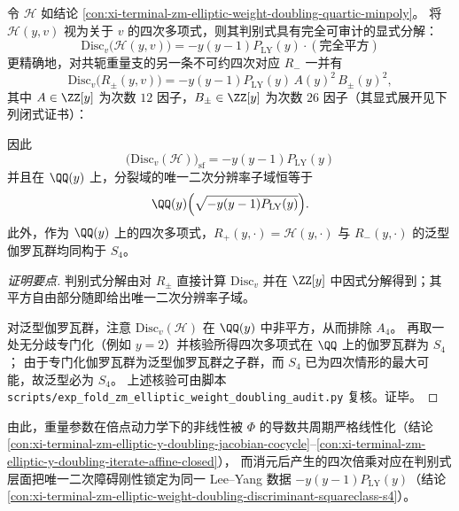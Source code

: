 \begin{conclusion}\label{con:xi-terminal-zm-elliptic-weight-doubling-discriminant-squareclass-s4}\label{con:xi-terminal-zm-elliptic-weight-doubling-quartic-elimination-disc}
令 \(\mathcal H\) 如结论 \ref{con:xi-terminal-zm-elliptic-weight-doubling-quartic-minpoly}。
将 \(\mathcal H(y,v)\) 视为关于 \(v\) 的四次多项式，则其判别式具有完全可审计的显式分解：
\[
\boxed{\;
\mathrm{Disc}_{v}\bigl(\mathcal H(y,v)\bigr)=-y(y-1)P_{\mathrm{LY}}(y)\cdot(\text{完全平方})\;}
\]
更精确地，对共轭重量支的另一条不可约四次对应 \(R_{-}\) 一并有
\[
\mathrm{Disc}_{v}\bigl(R_{\pm}(y,v)\bigr)=-y(y-1)P_{\mathrm{LY}}(y)\,A(y)^{2}\,B_{\pm}(y)^{2},
\]
其中 \(A\in\ZZ[y]\) 为次数 \(12\) 因子，\(B_{\pm}\in\ZZ[y]\) 为次数 \(26\) 因子（其显式展开见下列闭式证书）：

因此
\[
\boxed{\;
\bigl(\mathrm{Disc}_{v}(\mathcal H)\bigr)_{\mathrm{sf}}=-y(y-1)P_{\mathrm{LY}}(y)\;}
\]
并且在 \(\QQ(y)\) 上，分裂域的唯一二次分辨率子域恒等于
\[
\QQ(y)\Bigl(\sqrt{-y(y-1)P_{\mathrm{LY}}(y)}\Bigr).
\]
此外，作为 \(\QQ(y)\) 上的四次多项式，\(R_{+}(y,\cdot)=\mathcal H(y,\cdot)\) 与 \(R_{-}(y,\cdot)\) 的泛型伽罗瓦群均同构于 \(S_{4}\)。
\end{conclusion}
\begin{proof}[证明要点]
判别式分解由对 \(R_{\pm}\) 直接计算 \(\mathrm{Disc}_{v}\) 并在 \(\ZZ[y]\) 中因式分解得到；其平方自由部分随即给出唯一二次分辨率子域。
\par
对泛型伽罗瓦群，注意 \(\mathrm{Disc}_{v}(\mathcal H)\) 在 \(\QQ(y)\) 中非平方，从而排除 \(A_{4}\)。
再取一处无分歧专门化（例如 \(y=2\)）并核验所得四次多项式在 \(\QQ\) 上的伽罗瓦群为 \(S_{4}\)；
由于专门化伽罗瓦群为泛型伽罗瓦群之子群，而 \(S_{4}\) 已为四次情形的最大可能，故泛型必为 \(S_{4}\)。
上述核验可由脚本 \texttt{scripts/exp\_fold\_zm\_elliptic\_weight\_doubling\_audit.py} 复核。证毕。
\end{proof}

由此，重量参数在倍点动力学下的非线性被 \(\Phi\) 的导数共周期严格线性化（结论 \ref{con:xi-terminal-zm-elliptic-y-doubling-jacobian-cocycle}--\ref{con:xi-terminal-zm-elliptic-y-doubling-iterate-affine-closed}），
而消元后产生的四次倍乘对应在判别式层面把唯一二次障碍刚性锁定为同一 Lee--Yang 数据 \(-y(y-1)P_{\mathrm{LY}}(y)\)（结论 \ref{con:xi-terminal-zm-elliptic-weight-doubling-discriminant-squareclass-s4}）。

